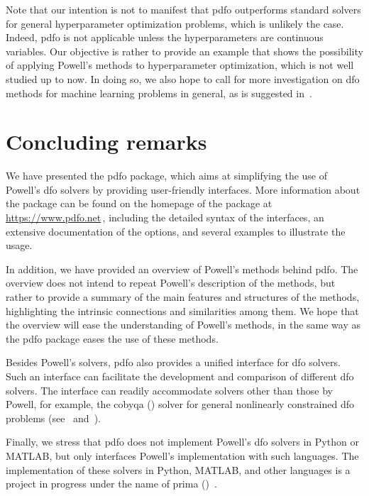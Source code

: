 \documentclass[manuscript,screen,review]{acmart}
\numberwithin{equation}{section}
\begin{document}
Note that our intention is not to manifest that \gls{pdfo} outperforms standard solvers for general hyperparameter optimization problems, which is unlikely the case.
Indeed, \gls{pdfo} is not applicable unless the hyperparameters are continuous variables.
Our objective is rather to provide an example that shows the possibility of applying Powell's methods to hyperparameter optimization, which is not well studied up to now.
In doing so, we also hope to call for more investigation on \gls{dfo} methods for machine learning problems in general, as is suggested in~\cite{Ghanbari_Scheinberg_2017}.

\section{Concluding remarks}
\label{sec:conclude}

We have presented the \gls{pdfo} package, which aims at simplifying the use of Powell's \gls{dfo} solvers by providing user-friendly interfaces.
More information about the package can be found on the homepage of the package at \mbox{\url{https://www.pdfo.net}}\,, including the detailed syntax of the interfaces, an extensive documentation of the options, and several examples to illustrate the usage.

In addition, we have provided an overview of Powell's methods behind \gls{pdfo}.
The overview does not intend to repeat Powell's description of the methods, but rather to provide a summary of the main features and structures of the methods, highlighting the intrinsic connections and similarities among them.
We hope that the overview will ease the understanding of Powell's methods, in the same way as the \gls{pdfo} package eases the use of these methods.

Besides Powell's solvers, \gls{pdfo} also provides a unified interface for \gls{dfo} solvers.
Such an interface can facilitate the development and comparison of different \gls{dfo} solvers.
The interface can readily accommodate solvers other than those by Powell, for example, the \gls{cobyqa} () solver for general nonlinearly
constrained \gls{dfo} problems (see~\cite[Chapters~5--7]{Ragonneau_2022} and~\cite{Ragonneau_Zhang_cobyqa}).

Finally, we stress that \gls{pdfo} does not implement Powell's \gls{dfo} solvers in Python or MATLAB, but only interfaces Powell's implementation with such languages.
The implementation of these solvers in Python, \mbox{MATLAB}, and other languages is a project in progress under the name of \gls{prima} ()~\cite{Zhang_prima}.



\end{document}
